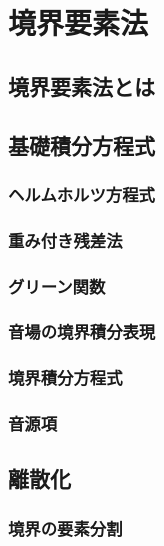 \chapter{境界要素法}

\section{境界要素法とは}



\section{基礎積分方程式}



\subsection{ヘルムホルツ方程式}

\subsection{重み付き残差法}

\subsection{グリーン関数}

\subsection{音場の境界積分表現}

\subsection{境界積分方程式}

\subsection{音源項}



\section{離散化}

\subsection{境界の要素分割}

